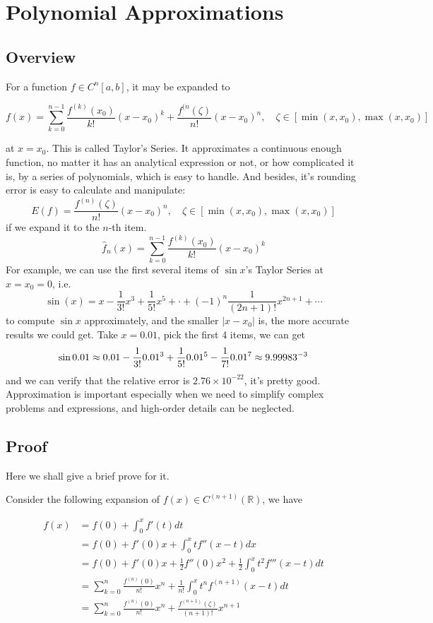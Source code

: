 \documentclass{article}
\begin{document}
\section{Polynomial Approximations}

\subsection{Overview}

For a function $f\in C^n[a,b]$, it may be expanded to 

$$f(x) = \sum_{k=0}^{n-1}\frac{f^{(k)}(x_0)}{k!}(x-x_0)^k + \frac{f^{(n}(\zeta)}{n!}(x-x_0)^n,\quad \zeta\in[\min(x,x_0),\max(x,x_0)]$$

at $x=x_0$. This is called Taylor's Series. It approximates a continuous enough function, no matter it has an analytical expression or not, or how complicated it is, by a series of polynomials, which is easy to handle. And besides, it's rounding error is easy to calculate and manipulate: 
$$E(f)=\frac{f^{(n)}(\zeta)}{n!}(x-x_0)^n,\quad \zeta\in[\min(x,x_0),\max(x,x_0)]$$
if we expand it to the $n$-th item.
$$\hat{f}_n(x)=\sum_{k=0}^{n-1}\frac{f^{(k)}(x_0)}{k!}(x-x_0)^k$$
For example, we can use the first several items of $\sin x$'s Taylor Series at $x=x_0=0$, i.e.\cite{sintaylor}
$$\sin(x)=x-\frac{1}{3!}x^3+\frac{1}{5!}x^5+\cdot+(-1)^{n}\frac{1}{(2n+1)!}x^{2n+1}+\cdots$$
to compute $\sin x$ approximately, and the smaller $|x-x_0|$ is, the more accurate results we could get.
Take $x=0.01$, pick the first 4 items, we can get
$$\sin 0.01\approx 0.01-\frac{1}{3!}0.01^3+\frac{1}{5!}0.01^5-\frac{1}{7!}0.01^7\approx 9.99983\time10^{-3}$$
and we can verify that the relative error is $2.76\times 10^{-22}$, it's pretty good.
Approximation is important especially when we need to simplify complex problems and expressions, and high-order details can be neglected.

\subsection{Proof}

Here we shall give a brief prove for it.

Consider the following expansion of $f(x)\in C^{(n+1)}(\mathbb{R})$, we have

$$\begin{array}{rl}
f(x)&=\displaystyle f(0)+\int_0^x f'(t)dt\\
&\displaystyle=f(0)+f'(0)x+\int_0^x tf''(x-t)dx\\
&\displaystyle=f(0)+f'(0)x+\frac{1}{2}f''(0)x^2+\frac{1}{2}\int_0^x t^2f'''(x-t)dt\\
&\displaystyle=\sum_{k=0}^n \frac{f^{(n)}(0)}{n!}x^n+\frac{1}{n!}\int_{0}^x t^nf^{(n+1)}(x-t)dt\\
&\displaystyle=\sum_{k=0}^n \frac{f^{(n)}(0)}{n!}x^n+\frac{f^{(n+1)}(\zeta)}{(n+1)!}x^{n+1}
\end{array}$$
\end{document}
